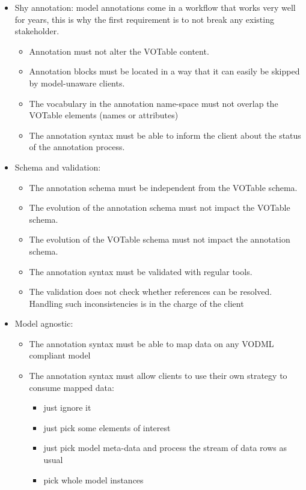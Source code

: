 \begin {itemize}
  \item Shy annotation: model annotations come in a workflow that works very well for years, this is why the first requirement is to not break any existing stakeholder.
  \begin {itemize}
    \item Annotation must not alter the VOTable content.
    \item Annotation blocks must be located in a way that it can easily be skipped by model-unaware clients.
    \item The vocabulary in the annotation name-space must not overlap the VOTable elements (names or attributes)    
    \item The annotation syntax must be able to inform the client about the status of the annotation process.
  \end {itemize}
  
  \item Schema and validation:
  \begin {itemize}
    \item The annotation schema must be independent from the VOTable schema.
    \item The evolution of the annotation schema must not impact the VOTable schema.
    \item The evolution of the VOTable schema must not impact the annotation schema.
    \item The annotation syntax must be validated with regular tools.
    \item The validation does not check whether references can be resolved.  Handling such inconsistencies is in the charge of the client
  \end {itemize}
  
  \item Model agnostic:
  \begin {itemize}
    \item The annotation syntax must be able to map data on any VODML compliant model
    \item The annotation syntax must allow clients to use their own strategy to consume mapped data:
      \begin {itemize}
        \item just ignore it
        \item just pick some elements of interest 
        \item just pick model meta-data and process the stream of data rows as usual
        \item pick whole model instances
      \end {itemize}
  \end {itemize}
  
\end {itemize}
